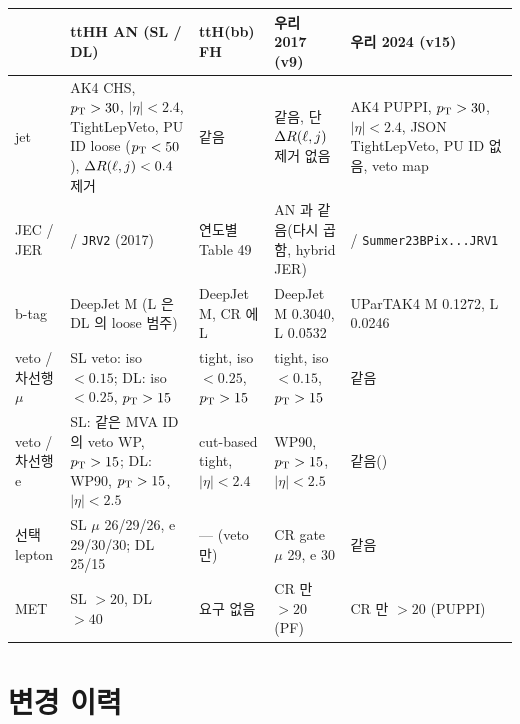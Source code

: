\begin{center}\begin{minipage}{\textwidth}
\label{tab:objects-summary}
\centering\scriptsize
\renewcommand{\arraystretch}{1.18}
\begin{tabularx}{\textwidth}{@{}>{\raggedright\arraybackslash}p{1.4cm}L L L L@{}}
\toprule
 & ttHH AN (SL / DL) & ttH(bb) FH & 우리 2017 (v9) & 우리 2024 (v15) \\
\midrule
jet & AK4 CHS, $p_{\mathrm{T}}>30$, $|\eta|<2.4$, TightLepVeto, PU ID loose ($p_{\mathrm{T}}<50$), $\Delta R(\ell,j)<0.4$ 제거 & 같음 & 같음, 단 $\Delta R(\ell,j)$ 제거 없음 & AK4 PUPPI, $p_{\mathrm{T}}>30$, $|\eta|<2.4$, JSON TightLepVeto, PU ID 없음, veto map \\
JEC / JER &  / \texttt{JRV2} (2017) & 연도별 Table 49 & AN 과 같음(다시 곱함, hybrid JER) &  / \texttt{Summer23BPix...JRV1} \\
b-tag & DeepJet M (L 은 DL 의 loose 범주) & DeepJet M, CR 에 L & DeepJet M 0.3040, L 0.0532 & UParTAK4 M 0.1272, L 0.0246 \\
veto / 차선행 $\mu$ & SL veto: iso $<0.15$; DL: iso $<0.25$, $p_{\mathrm{T}}>15$ & tight, iso $<0.25$, $p_{\mathrm{T}}>15$ & tight, iso $<0.15$, $p_{\mathrm{T}}>15$ & 같음 \\
veto / 차선행 e & SL: 같은 MVA ID 의 veto WP, $p_{\mathrm{T}}>15$; DL: WP90, $p_{\mathrm{T}}>15$, $|\eta|<2.5$ & cut-based tight, $|\eta|<2.4$ & WP90, $p_{\mathrm{T}}>15$, $|\eta|<2.5$ & 같음() \\
선택 lepton & SL $\mu$ 26/29/26, e 29/30/30; DL 25/15 & --- (veto 만) & CR gate $\mu$ 29, e 30 & 같음 \\
MET & SL $>20$, DL $>40$ & 요구 없음 & CR 만 $>20$ (PF) & CR 만 $>20$ (PUPPI) \\
\bottomrule
\end{tabularx}\end{minipage}
\end{center}

\section{변경 이력}\label{sec:objects-history}

